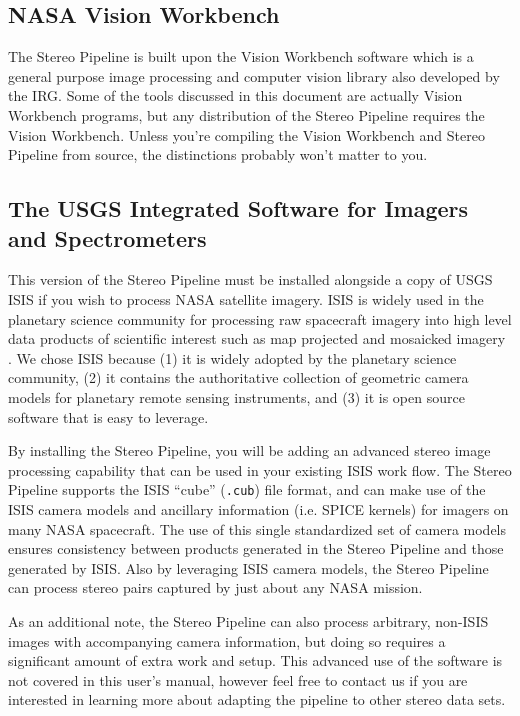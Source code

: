 \subsection{NASA Vision Workbench}

The Stereo Pipeline is built upon the Vision Workbench software
which is a general purpose image processing and computer vision
library also developed by the \ac{IRG}.  Some of the tools discussed
in this document are actually Vision Workbench programs, but any
distribution of the Stereo Pipeline requires the Vision Workbench.
Unless you're compiling the Vision Workbench and Stereo Pipeline from
source, the distinctions probably won't matter to you.


\subsection{The USGS Integrated Software for Imagers and Spectrometers}

This version of the Stereo Pipeline must be installed alongside a copy
of \ac{USGS} \ac{ISIS} if you wish to process NASA satellite
imagery. \ac{ISIS} is widely used in the planetary science community
for processing raw spacecraft imagery into high level data products of
scientific interest such as map projected and mosaicked imagery
\cite{2004LPI....35.2039A, 1997LPI....28..387G, ISIS_website}.  We
chose \ac{ISIS} because (1) it is widely adopted by the planetary
science community, (2) it contains the authoritative collection of
geometric camera models for planetary remote sensing instruments, and
(3) it is open source software that is easy to leverage.

By installing the Stereo Pipeline, you will be adding an advanced
stereo image processing capability that can be used in your existing
\ac{ISIS} work flow.  The Stereo Pipeline supports the \ac{ISIS}
``cube'' (\texttt{.cub}) file format, and can make use of the \ac{ISIS}
camera models and ancillary information (i.e. SPICE kernels) for
imagers on many \ac{NASA} spacecraft.  The use of this single standardized
set of camera models ensures consistency between products generated
in the Stereo Pipeline and those generated by \ac{ISIS}.  Also by
leveraging \ac{ISIS} camera models, the Stereo Pipeline can process
stereo pairs captured by just about any \ac{NASA} mission.

As an additional note, the Stereo Pipeline can also process arbitrary,
non-ISIS images with accompanying camera information, but doing so
requires a significant amount of extra work and setup. This advanced
use of the software is not covered in this user's manual, however feel
free to contact us if you are interested in learning more about
adapting the pipeline to other stereo data sets.

